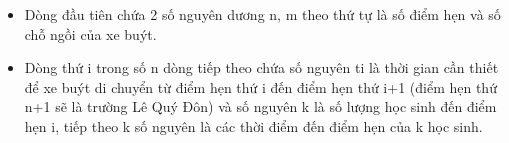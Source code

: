 \begin{itemize}
	\item     Dòng đầu tiên chứa 2 số nguyên dương n, m theo thứ tự là số điểm hẹn và số chỗ ngồi của xe buýt.   
	\item     Dòng thứ i trong số n dòng tiếp theo chứa số nguyên ti là thời gian cần thiết để xe buýt di chuyển từ điểm hẹn thứ i đến điểm hẹn thứ i+1 (điểm hẹn thứ n+1 sẽ là trường Lê Quý Đôn) và số nguyên k là số   lượng học sinh đến điểm hẹn i, tiếp theo k số nguyên là các thời điểm đến điểm hẹn của k học sinh.   
\end{itemize}